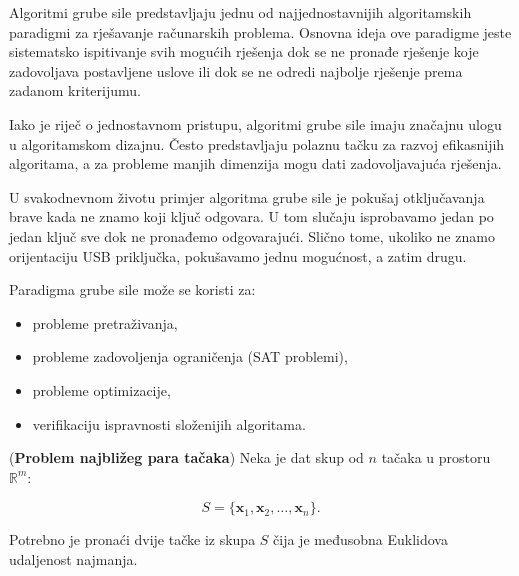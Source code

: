 Algoritmi grube sile predstavljaju jednu od najjednostavnijih algoritamskih paradigmi za rješavanje računarskih problema. Osnovna ideja ove paradigme jeste sistematsko ispitivanje svih mogućih rješenja dok se ne pronađe rješenje koje zadovoljava postavljene uslove ili dok se ne odredi najbolje rješenje prema zadanom kriterijumu.

Iako je riječ o jednostavnom pristupu, algoritmi grube sile imaju značajnu ulogu u algoritamskom dizajnu. Često predstavljaju polaznu tačku za razvoj efikasnijih algoritama, a za probleme manjih dimenzija mogu dati zadovoljavajuća rješenja.

U svakodnevnom životu primjer algoritma grube sile je pokušaj otključavanja brave kada ne znamo koji ključ odgovara. U tom slučaju isprobavamo jedan po jedan ključ sve dok ne pronađemo odgovarajući. Slično tome, ukoliko ne znamo orijentaciju USB priključka, pokušavamo jednu mogućnost, a zatim drugu.

Paradigma grube sile može se koristi za:

\begin{itemize}
	\item probleme pretraživanja,
	\item probleme zadovoljenja ograničenja (SAT problemi),
	\item probleme optimizacije,
	\item verifikaciju ispravnosti složenijih algoritama.
\end{itemize}

\begin{example}(\textbf{Problem najbližeg para tačaka}) Neka je dat skup od $n$ tačaka u prostoru $\mathbb{R}^m$:
	
	\[
	S=\{\mathbf{x}_1,\mathbf{x}_2,\ldots,\mathbf{x}_n\}.
	\]
	
	Potrebno je pronaći dvije tačke iz skupa $S$ čija je međusobna Euklidova udaljenost najmanja.
	
\end{example}

